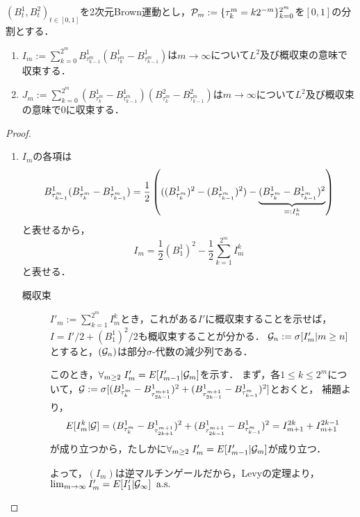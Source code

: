 \documentclass[uplatex,dvipdfmx]{jsarticle}
\begin{document}
\begin{proposition*}
    $(B^1_t,B^2_t)_{t\in[0,1]}$を2次元Brown運動とし，$\P_m:=\{\tau^m_k=k2^{-m}\}^{2^m}_{k=0}$を$[0,1]$の分割とする．
    \begin{enumerate}
        \item $I_m:=\sum_{k=0}^{2^m}B^1_{\tau^m_{k-1}}(B^1_{\tau^m_k}-B^1_{\tau^m_{k-1}})$は$m\to\infty$について$L^2$及び概収束の意味で収束する．
        \item $J_m:=\sum_{k=0}^{2^m}(B^1_{\tau^m_k}-B^1_{\tau^m_{k-1}})(B^2_{\tau^m_k}-B^2_{\tau^m_{k-1}})$は$m\to\infty$について$L^2$及び概収束の意味で$0$に収束する．
    \end{enumerate}
\end{proposition*}
\begin{proof}\mbox{}
    \begin{enumerate}
        \item $I_m$の各項は
        \begin{align*}
            B^1_{\tau^m_{k-1}}(B^1_{\tau^m_{k}}-B^1_{\tau^m_{k-1}})=\frac{1}{2}\paren{((B^1_{\tau^m_{k}})^2-(B^1_{\tau^m_{k-1}})^2)-\underbrace{(B^1_{\tau^m_{k}}-B^1_{\tau^m_{k-1}})^2}_{=:I_n^k}}
        \end{align*}
        と表せるから，
        \[I_m=\frac{1}{2}(B_1^1)^2-\frac{1}{2}\sum_{k=1}^{2^m}I_m^k\]
        と表せる．
        \begin{description}
            \item[概収束] $I'_m:=\sum_{k=1}^{2^m}I_m^k$とき，これがある$I'$に概収束することを示せば，$I=I'/2+(B_1^1)^2/2$も概収束することが分かる．
            $\cG_n:=\sigma[I'_m|m\ge n]$とすると，$(\cG_n)$は部分$\sigma$-代数の減少列である．
            
            このとき，$\forall_{m\ge2}\;I'_m=E[I'_{m-1}|\cG_m]$を示す．
            まず，各$1\le k\le 2^m$について，$\cG:=\sigma[(B^1_{\tau^m_{k}}-B^1_{\tau^{m+1}_{2k-1}})^2+(B^1_{\tau^{m+1}_{2k-1}}-B^1_{\tau^{m}_{k-1}})^2]$とおくと，
            補題より，
            \[E[I_m^k|\cG]=(B^1_{\tau^m_{k}}-B^1_{\tau^{m+1}_{2k+1}})^2+(B^1_{\tau^{m+1}_{2k-1}}-B^1_{\tau^{m}_{k-1}})^2=I_{m+1}^{2k}+I_{m+1}^{2k-1}\]
            が成り立つから，たしかに$\forall_{m\ge2}\;I'_m=E[I'_{m-1}|\cG_m]$が成り立つ．

            よって，$(I_m)$は逆マルチンゲールだから，Levyの定理より，$\lim_{m\to\infty}I'_m=E[I'_1|\cG_\infty]\;\as$
            
            

\end{description}
\end{enumerate}
\end{proof}
\end{document}
